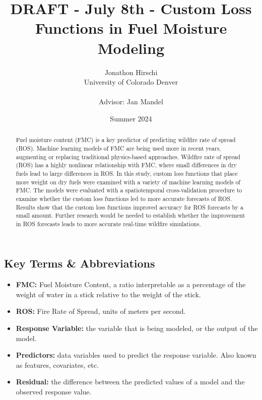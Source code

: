 \documentclass[11pt]{article}%
\begin{document}
\title{DRAFT - July 8th - Custom Loss Functions in Fuel Moisture Modeling}
\author{
    \begin{tabular}[t]{c}
        Jonathon Hirschi \\
        University of Colorado Denver \\
        \\
        Advisor: Jan Mandel
    \end{tabular}
}

\date{Summer 2024}
\maketitle

\begin{abstract}
Fuel moisture content (FMC) is a key predictor of predicting wildfire rate of spread (ROS). Machine learning models of FMC are being used more in recent years, augmenting or replacing traditional physics-based approaches. Wildfire rate of spread (ROS) has a highly nonlinear relationship with FMC, where small differences in dry fuels lead to large differences in ROS. In this study, custom loss functions that place more weight on dry fuels were examined with a variety of machine learning models of FMC. The models were evaluated with a spatiotemporal cross-validation procedure to examine whether the custom loss functions led to more accurate forecasts of ROS. Results show that the custom loss functions improved accuracy for ROS forecasts by a small amount. Further research would be needed to establish whether the improvement in ROS forecasts leads to more accurate real-time wildfire simulations.
\end{abstract}

\subsection*{Key Terms \& Abbreviations}
\begin{itemize}
    \item \textbf{FMC:} Fuel Moisture Content, a ratio interpretable as a percentage of the weight of water in a stick relative to the weight of the stick.
    \item \textbf{ROS:} Fire Rate of Spread, units of meters per second.
    \item \textbf{Response Variable:} the variable that is being modeled, or the output of the model.
    \item \textbf{Predictors:} data variables used to predict the response variable. Also known as features, covariates, etc.
    \item \textbf{Residual:} the difference between the predicted values of a model and the observed response value.
\end{itemize}
\end{document}

